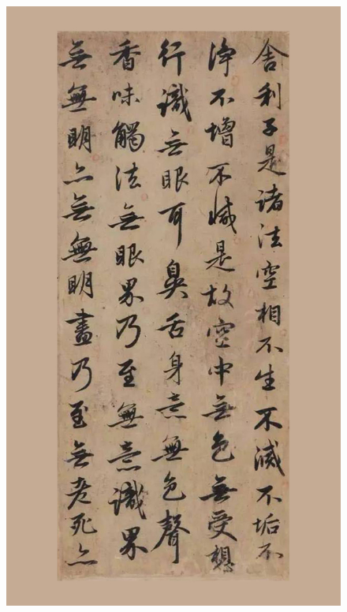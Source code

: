 \documentclass[a4paper,twoside]{article}
\begin{document}
\begin{figure}[ht]
\centering
\includegraphics[width=13.2cm]{images/zhaomengfu-2}
\end{figure}
\end{document}
